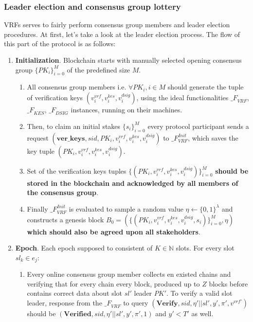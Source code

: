 \subsubsection{Leader election and consensus group lottery}
VRFs serves to fairly perform consensus group members and leader election procedures.
At first, let's take a look at the leader election process.
The flow of this part of the protocol is as follows:
\begin{enumerate}
    \item \textbf{Initialization}.
    Blockchain starts with manually selected opening consensus group $\{PK_i\}_{i=0}^M$ of the predefined size $M$.
    \begin{enumerate}
        \item All consensus group members i.e. $\forall PK_i, i \in M$ should generate the tuple of verification keys ${(v_i^{vrf}, v_i^{kes}, v_i^{dsig})}$, using the ideal functionalities ${\mathcal_{F}}_{VRF}$, ${\mathcal_{F}}_{KES}$, ${\mathcal_{F}}_{DSIG}$ instances, running on their machines.
        \item Then, to claim an initial stakes $\{s_i\}_{i=0}^M$ every protocol participant sends a request ${(\textbf{ver\_keys}, sid, PK_i, v_i^{vrf}, v_i^{kes}, v_i^{dsig})}$ to ${\mathcal_{F}}_{VRF}^{Init}$, which saves the key tuple ${(PK_i, v_i^{vrf}, v_i^{kes}, v_i^{dsig})}$.
        \item Set of the verification keys tuples ${\{(PK_i, v_i^{vrf}, v_i^{kes}, v_i^{dsig})\}_{i=0}^M}$ \textbf{should be stored in the blockchain and acknowledged by all members of the consensus group}.
        \item Finally ${\mathcal_{F}}_{VRF}^{Init}$ is evaluated to sample a random value $\eta \leftarrow \{0, 1\}^\lambda$ and constructs a genesis block ${B_0=\left(\{(PK_i, v_i^{vrf}, v_i^{kes}, v_i^{dsig}, s_i)\}_{i=0}^M, \eta\right)}$ \textbf{which should also be agreed upon all stakeholders}.
    \end{enumerate}
    \item \textbf{Epoch}.
    Each epoch supposed to consistent of $K \in \mathbb{N}$ slots.
    For every slot ${sl_k\in e_j}$:
    \begin{enumerate}
        \item Every online consensus group member collects en existed chains and verifying that for every chain every block, produced up to $Z$ blocks before contains correct data about slot $sl'$ leader $PK'$.
        To verify a valid slot leader, response from the ${\mathcal_{F}}_{VRF}$ to query ${(\textbf{Verify}, sid, \eta' || sl', y', \pi', v^{vrf'})}$ should be ${(\textbf{Verified}, sid, \eta' || sl', y', \pi', 1)}$ and $y'<T'$ as well.

\end{enumerate}
\end{enumerate}
